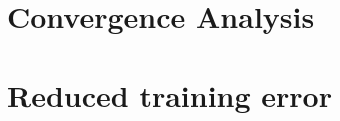 \section{Convergence Analysis}\label{appd:convg}


\section{Reduced training error}\label{appd:proof}


%

